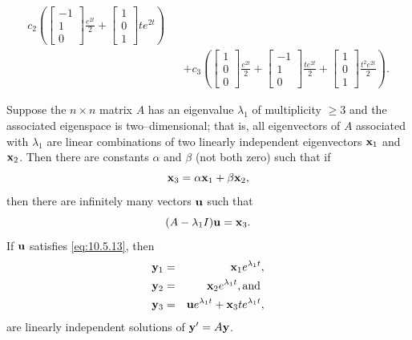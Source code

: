 \documentclass{ximera}
\begin{document}
\begin{example}
\begin{explanation}
\begin{eqnarray*}
c_2\left(\begin{bmatrix}-1\\1\\0\end{bmatrix}\frac{e^{2t}}{2}+\begin{bmatrix}1\\0\\1\end{bmatrix}te^{2t}\right)\\
&&+c_3\left(\begin{bmatrix}1\\0\\0\end{bmatrix}\frac{e^{2t}}{2}+
\begin{bmatrix}-1\\1\\0\end{bmatrix}\frac{te^{2t}}{2}+\begin{bmatrix}1\\0\\1\end{bmatrix}\frac{t^2e^{2t}}{2}\right).
\end{eqnarray*}
\end{explanation}
\end{example}

\begin{theorem}\label{thmtype:10.5.3}
Suppose the $n\times n$ matrix $A$ has an eigenvalue $\lambda_1$ of
multiplicity $\geq 3$ and the associated eigenspace is
two--dimensional; that is, all eigenvectors of $A$ associated with
$\lambda_1$ are linear combinations of two linearly independent
eigenvectors ${\bf x}_1$ and ${\bf x}_2$. Then there are constants
$\alpha$ and $\beta$ (not both zero) such that if
\begin{equation}\label{eq:10.5.12}
{\bf x}_3=\alpha{\bf x}_1+\beta{\bf x}_2,
\end{equation}
then there are infinitely many vectors ${\bf u}$ such that
\begin{equation}\label{eq:10.5.13}
(A-\lambda_1I){\bf u}={\bf x}_3.
\end{equation}
If ${\bf u}$ satisfies  \eqref{eq:10.5.13}, then
\begin{eqnarray}
{\bf y}_1&=&{\bf x}_1 e^{\lambda_1t},\nonumber\\
{\bf y}_2&=&{\bf x}_2e^{\lambda_1t},\mbox{and }\nonumber\\
{\bf y}_3&=&{\bf u}e^{\lambda_1t}+{\bf x}_3te^{\lambda_1t}\label{eq:10.5.14},
\end{eqnarray}
are linearly independent solutions of  ${\bf y}'=A{\bf y}$.
\end{theorem}
\end{document}
